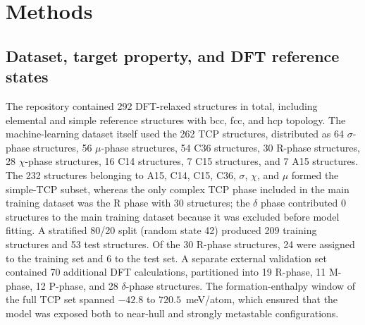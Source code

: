 \documentclass[prb,twocolumn,floatfix]{revtex4-2}
\begin{document}
\section{Methods}

\subsection{Dataset, target property, and DFT reference states}

The repository contained 292 DFT-relaxed structures in total, including elemental and simple reference structures with bcc, fcc, and hcp topology. The machine-learning dataset itself used the 262 TCP structures, distributed as 64 $\sigma$-phase structures, 56 $\mu$-phase structures, 54 C36 structures, 30 R-phase structures, 28 $\chi$-phase structures, 16 C14 structures, 7 C15 structures, and 7 A15 structures. The 232 structures belonging to A15, C14, C15, C36, $\sigma$, $\chi$, and $\mu$ formed the simple-TCP subset, whereas the only complex TCP phase included in the main training dataset was the R phase with 30 structures; the $\delta$ phase contributed 0 structures to the main training dataset because it was excluded before model fitting. A stratified 80/20 split (random state 42) produced 209 training structures and 53 test structures. Of the 30 R-phase structures, 24 were assigned to the training set and 6 to the test set. A separate external validation set contained 70 additional DFT calculations, partitioned into 19 R-phase, 11 M-phase, 12 P-phase, and 28 $\delta$-phase structures. The formation-enthalpy window of the full TCP set spanned $-42.8$ to $720.5$~meV/atom, which ensured that the model was exposed both to near-hull and strongly metastable configurations.
\end{document}
